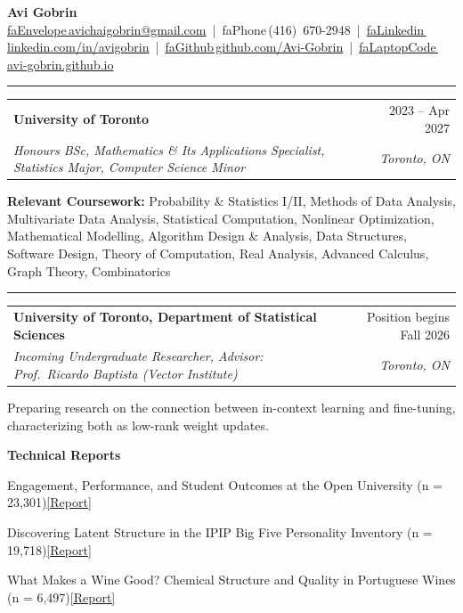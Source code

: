 \documentclass[letterpaper,10pt]{article}
\makeatletter
\newcommand{\I}[1]{\csname fa#1\endcsname\,}%
\newcommand{\Section}[1]{\vspace{4pt}{\large\bfseries #1}\vspace{1pt}\hrule\vspace{3pt}}
\newcommand{\entry}[4]{%
  \vspace{2pt}%
  \begin{tabular*}{\textwidth}{@{}l@{\extracolsep{\fill}}r@{}}
    \textbf{#1} & #2 \\
    \textit{#3} & \textit{#4} \\
  \end{tabular*}\vspace{-4pt}}
\newenvironment{bullets}%
  {\begin{list}{\textbullet}{%
     \setlength{\leftmargin}{1.3em}\setlength{\labelsep}{0.5em}%
     \setlength{\itemsep}{1.5pt}\setlength{\topsep}{2pt}%
     \setlength{\parsep}{0pt}\setlength{\partopsep}{0pt}}}%
  {\end{list}}
\makeatother
\begin{document}
\begin{center}
  {\Huge\bfseries Avi Gobrin}\\[4pt]
  \small
  \mbox{\href{mailto:avichaigobrin@gmail.com}{\I{Envelope}avichaigobrin@gmail.com}} \,|\,
  \mbox{\I{Phone}(416)~670-2948} \,|\,
  \mbox{\href{https://www.linkedin.com/in/avigobrin/}{\I{Linkedin}linkedin.com/in/avigobrin}} \,|\,
  \mbox{\href{https://github.com/Avi-Gobrin}{\I{Github}github.com/Avi-Gobrin}} \,|\,
  \mbox{\href{https://avi-gobrin.github.io/personal-site/}{\I{LaptopCode}avi-gobrin.github.io}}
\end{center}

\Section{Education}
\entry{University of Toronto}{2023 -- Apr 2027}{Honours BSc, Mathematics \& Its Applications Specialist, Statistics Major, Computer Science Minor}{Toronto, ON}
\par\vspace{6pt}\noindent
\textbf{Relevant Coursework:} Probability \& Statistics I/II, Methods of Data Analysis, Multivariate Data Analysis, Statistical Computation, Nonlinear Optimization, Mathematical Modelling, Algorithm Design \& Analysis, Data Structures, Software Design, Theory of Computation, Real Analysis, Advanced Calculus, Graph Theory, Combinatorics

\Section{Research}
\entry{University of Toronto, Department of Statistical Sciences}{Position begins Fall 2026}%
      {Incoming Undergraduate Researcher, Advisor: Prof.\ Ricardo Baptista (Vector Institute)}{Toronto, ON}
\begin{bullets}
  \item Preparing research on the connection between in-context learning and fine-tuning, characterizing both as low-rank weight updates.
\end{bullets}
\vspace{3pt}
\textbf{Technical Reports}
\begin{bullets}
  \item Engagement, Performance, and Student Outcomes at the Open University (n = 23{,}301)\quad\href{https://avi-gobrin.github.io/personal-site/assets/oulad-sta437.pdf}{[Report]}
  \item Discovering Latent Structure in the IPIP Big Five Personality Inventory (n = 19{,}718)\quad\href{https://avi-gobrin.github.io/personal-site/assets/big-five-sta437.pdf}{[Report]}
  \item What Makes a Wine Good? Chemical Structure and Quality in Portuguese Wines (n = 6{,}497)\quad\href{https://avi-gobrin.github.io/personal-site/assets/wine-quality-sta437.pdf}{[Report]}
\end{bullets}
\end{document}
